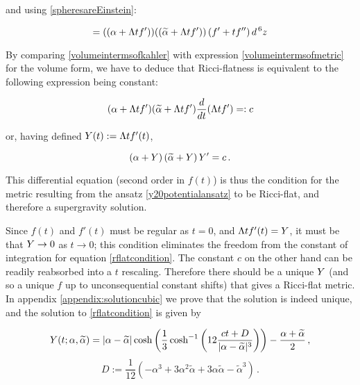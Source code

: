 and using \eqref{spheresareEinstein}:

\begin{equation}
	= ((\alpha + \Lambda t f'))((\widetilde{\alpha} + \Lambda t f')) \left( f' +tf'' \right) d^{\,6} z
	\label{volumeintermsofkahler}
\end{equation}

By comparing \eqref{volumeintermsofkahler} with expression \eqref{volumeintermsofmetric} for the volume form, we have to deduce that Ricci-flatness is equivalent to the following expression being constant:


\begin{equation}
	(\alpha + \Lambda t f')(\widetilde{\alpha} + \Lambda t f') \frac{d}{dt} (\Lambda t f') =: c 
\end{equation}

or, having defined $Y(t) := \Lambda t f'(t)$,

\begin{equation}
	(\alpha + Y)\,(\widetilde{\alpha} + Y)\, Y' = c\,. \label{rflatcondition}
\end{equation}

This differential equation (second order in $f(t)$) is thus the condition for the metric resulting from the ansatz \eqref{y20potentialansatz} to be Ricci-flat, and therefore a supergravity solution.

Since $f(t)$ and $f'(t)$ must be regular as $t=0$, and $\Lambda t f'(t) = Y$, it must be that $Y \rightarrow 0$ as $t\rightarrow 0$; this condition eliminates the freedom from the constant of integration for equation \eqref{rflatcondition}. The constant $c$ on the other hand can be readily reabsorbed into a $t$ rescaling. Therefore there should be a unique $Y$ (and so a unique $f$ up to unconsequential constant shifts) that gives a Ricci-flat metric. In appendix \ref{appendix:solutioncubic} we prove that the solution is indeed unique, and the solution to \eqref{rflatcondition} is given by


\begin{equation}
	Y(t;\alpha,\widetilde{\alpha})  = |\alpha - \widetilde{\alpha}| \cosh \left( \frac{1}{3} \cosh^{-1} \left(  12 \frac{ct + D}{|\alpha-\widetilde{\alpha}|^3}  \right) \right)  - \frac{\alpha + \widetilde{\alpha}}{2}\,,
	\label{ysolutionmain}
\end{equation}
\begin{equation}
	 D := \frac{1}{12}(-\alpha^3 + 3 \alpha^2 \tilde\alpha + 3 \alpha\tilde{\alpha} - \tilde{\alpha}^3) \,.
	\label{}
\end{equation}

